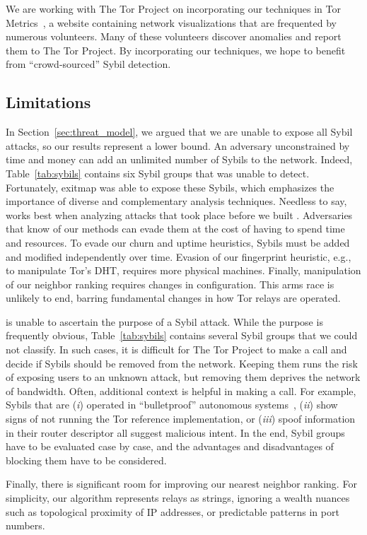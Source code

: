 We are working with The Tor Project on incorporating our techniques in Tor
Metrics~\cite{metrics}, a website containing network visualizations that are
frequented by numerous volunteers.  Many of these volunteers discover anomalies
and report them to The Tor Project.  By incorporating our techniques, we hope
to benefit from ``crowd-sourced'' Sybil detection.

\subsection{Limitations}
\label{sec:limitations}
In Section~\ref{sec:threat_model}, we argued that we are unable to expose all
Sybil attacks, so our results represent a lower bound.  An adversary
unconstrained by time and money can add an unlimited number of Sybils to the
network.  Indeed, Table~\ref{tab:sybils} contains six Sybil groups that \sys was
unable to detect.  Fortunately, exitmap was able to expose these Sybils, which
emphasizes the importance of diverse and complementary analysis techniques.
Needless to say, \sys works best when analyzing attacks that took place before
we built \sys.  Adversaries that know of our methods can evade them at the cost
of having to spend time and resources.  To evade our churn and uptime
heuristics, Sybils must be added and modified independently over time.  Evasion
of our fingerprint heuristic, e.g., to manipulate Tor's DHT, requires more
physical machines.  Finally, manipulation of our neighbor ranking requires
changes in configuration.  This arms race is unlikely to end, barring
fundamental changes in how Tor relays are operated.

\Sys is unable to ascertain the purpose of a Sybil attack.  While the purpose
is frequently obvious, Table~\ref{tab:sybils} contains several Sybil groups
that we could not classify.  In such cases, it is difficult for The Tor Project
to make a call and decide if Sybils should be removed from the network.
Keeping them runs the risk of exposing users to an unknown attack, but removing
them deprives the network of bandwidth.  Often, additional context is helpful
in making a call.  For example, Sybils that are (\emph{i}) operated in
``bulletproof'' autonomous systems~\cite[\S~2]{Konte2015a}, (\emph{ii}) show
signs of not running the Tor reference implementation, or (\emph{iii}) spoof
information in their router descriptor all suggest malicious intent.  In the
end, Sybil groups have to be evaluated case by case, and the advantages and
disadvantages of blocking them have to be considered.

Finally, there is significant room for improving our nearest neighbor ranking.
For simplicity, our algorithm represents relays as strings, ignoring a wealth
nuances such as topological proximity of IP addresses, or predictable patterns
in port numbers.
